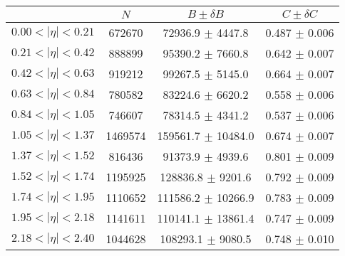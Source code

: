 \begin{tabular}{lccc}
\hline
    &   $N$   & $B \pm \delta B$  &  $C \pm \delta C$ \\
\hline
$0.00 < |\eta| <0.21$          & 672670     & 72936.9    $\pm$ 4447.8 & 0.487      $\pm$ 0.006 \\
$0.21 < |\eta| <0.42$          & 888899     & 95390.2    $\pm$ 7660.8 & 0.642      $\pm$ 0.007 \\
$0.42 < |\eta| <0.63$          & 919212     & 99267.5    $\pm$ 5145.0 & 0.664      $\pm$ 0.007 \\
$0.63 < |\eta| <0.84$          & 780582     & 83224.6    $\pm$ 6620.2 & 0.558      $\pm$ 0.006 \\
$0.84 < |\eta| <1.05$          & 746607     & 78314.5    $\pm$ 4341.2 & 0.537      $\pm$ 0.006 \\
$1.05 < |\eta| <1.37$          & 1469574    & 159561.7   $\pm$ 10484.0 & 0.674      $\pm$ 0.007 \\
$1.37 < |\eta| <1.52$          & 816436     & 91373.9    $\pm$ 4939.6 & 0.801      $\pm$ 0.009 \\
$1.52 < |\eta| <1.74$          & 1195925    & 128836.8   $\pm$ 9201.6 & 0.792      $\pm$ 0.009 \\
$1.74 < |\eta| <1.95$          & 1110652    & 111586.2   $\pm$ 10266.9 & 0.783      $\pm$ 0.009 \\
$1.95 < |\eta| <2.18$          & 1141611    & 110141.1   $\pm$ 13861.4 & 0.747      $\pm$ 0.009 \\
$2.18 < |\eta| <2.40$          & 1044628    & 108293.1   $\pm$ 9080.5 & 0.748      $\pm$ 0.010 \\
\hline
\end{tabular}
